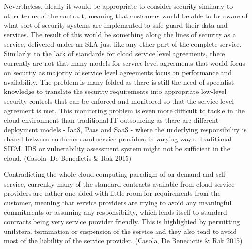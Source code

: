 \documentclass{article}
\begin{document}
Nevertheless, ideally it would be appropriate to consider security similarly to other terms of the contract, meaning that customers would be able to be aware of what sort of security systems are implemented to safe guard their data and services. The result of this would be something along the lines of security as a service, delivered under an SLA just like any other part of the complete service. Similarly, to the lack of standards for cloud service level agreements, there currently are not that many models for service level agreements that would focus on security as majority of service level agreements focus on performance and availability. The problem is many folded as there is still the need of specialist knowledge to translate the security requirements into appropriate low-level security controls that can be enforced and monitored so that the service level agreement is met. This monitoring problem is even more difficult to tackle in the cloud environment than traditional IT outsourcing as there are different deployment models - IaaS, Paas and SaaS - where the underlying responsibility is shared between customers and service providers in varying ways. Traditional SIEM, IDS or vulnerability assessment system might not be sufficient in the cloud. (Casola, De Benedictis \& Rak 2015)
\par
Contradicting the whole cloud computing paradigm of on-demand and self-service, currently many of the standard contracts available from cloud service providers are rather one-sided with little room for requirements from the customer, meaning that service providers are trying to avoid any meaningful commitments or assuming any responsibility, which lends itself to standard contracts being very service provider friendly. This is highlighted by permitting unilateral termination or suspension of the service and they also tend to avoid most of the liability of the service provider. (Casola, De Benedictis \& Rak 2015)
\end{document}
